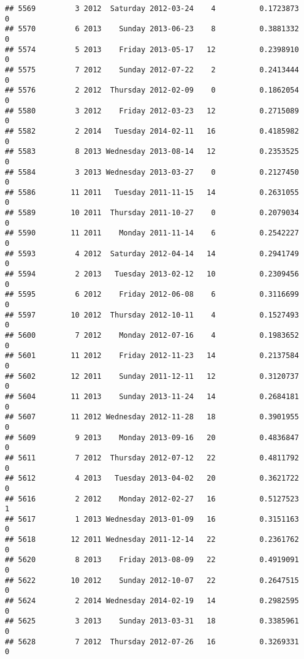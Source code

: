 \documentclass[
]{article}
\begin{document}
\begin{verbatim}
## 5569         3 2012  Saturday 2012-03-24    4          0.1723873             0
## 5570         6 2013    Sunday 2013-06-23    8          0.3881332             0
## 5574         5 2013    Friday 2013-05-17   12          0.2398910             0
## 5575         7 2012    Sunday 2012-07-22    2          0.2413444             0
## 5576         2 2012  Thursday 2012-02-09    0          0.1862054             0
## 5580         3 2012    Friday 2012-03-23   12          0.2715089             0
## 5582         2 2014   Tuesday 2014-02-11   16          0.4185982             0
## 5583         8 2013 Wednesday 2013-08-14   12          0.2353525             0
## 5584         3 2013 Wednesday 2013-03-27    0          0.2127450             0
## 5586        11 2011   Tuesday 2011-11-15   14          0.2631055             0
## 5589        10 2011  Thursday 2011-10-27    0          0.2079034             0
## 5590        11 2011    Monday 2011-11-14    6          0.2542227             0
## 5593         4 2012  Saturday 2012-04-14   14          0.2941749             0
## 5594         2 2013   Tuesday 2013-02-12   10          0.2309456             0
## 5595         6 2012    Friday 2012-06-08    6          0.3116699             0
## 5597        10 2012  Thursday 2012-10-11    4          0.1527493             0
## 5600         7 2012    Monday 2012-07-16    4          0.1983652             0
## 5601        11 2012    Friday 2012-11-23   14          0.2137584             0
## 5602        12 2011    Sunday 2011-12-11   12          0.3120737             0
## 5604        11 2013    Sunday 2013-11-24   14          0.2684181             0
## 5607        11 2012 Wednesday 2012-11-28   18          0.3901955             0
## 5609         9 2013    Monday 2013-09-16   20          0.4836847             0
## 5611         7 2012  Thursday 2012-07-12   22          0.4811792             0
## 5612         4 2013   Tuesday 2013-04-02   20          0.3621722             0
## 5616         2 2012    Monday 2012-02-27   16          0.5127523             1
## 5617         1 2013 Wednesday 2013-01-09   16          0.3151163             0
## 5618        12 2011 Wednesday 2011-12-14   22          0.2361762             0
## 5620         8 2013    Friday 2013-08-09   22          0.4919091             0
## 5622        10 2012    Sunday 2012-10-07   22          0.2647515             0
## 5624         2 2014 Wednesday 2014-02-19   14          0.2982595             0
## 5625         3 2013    Sunday 2013-03-31   18          0.3385961             0
## 5628         7 2012  Thursday 2012-07-26   16          0.3269331             0

\end{verbatim}
\end{document}
